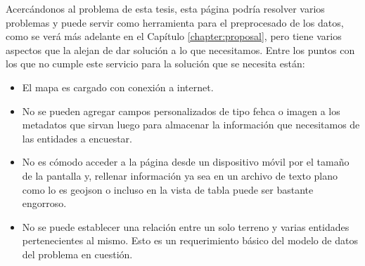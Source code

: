 Acercándonos al problema de esta tesis, esta página podría resolver varios problemas y puede servir como herramienta para el preprocesado de los datos, como se verá más
adelante en el Capítulo \ref{chapter:proposal}, pero tiene varios aspectos que la alejan de dar solución a lo que necesitamos. Entre los puntos con los que no cumple este servicio
para la solución que se necesita están:
\begin{itemize}
    \item El mapa es cargado con conexión a internet.
    \item No se pueden agregar campos personalizados de tipo fehca o imagen a los metadatos que sirvan luego para almacenar la información que necesitamos de las entidades a encuestar.
    \item No es cómodo acceder a la página desde un dispositivo móvil por el tamaño de la pantalla y, rellenar información ya sea en un archivo de texto plano como lo es geojson o incluso en la vista de tabla puede ser bastante engorroso.
    \item No se puede establecer una relación entre un solo terreno y varias entidades pertenecientes al mismo. Esto es un requerimiento básico del modelo de datos del problema en cuestión.
\end{itemize}







